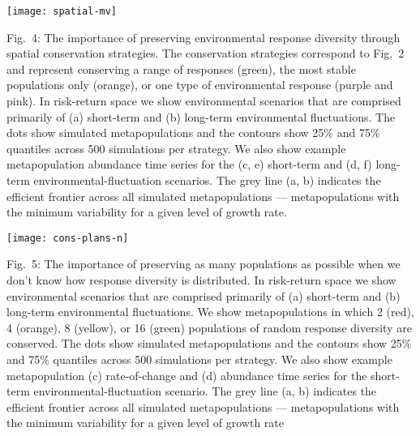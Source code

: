 \documentclass[11pt]{article}
\begin{document}
\begin{spacing}{1.4}
\clearpage

\begin{center}
\texttt{[image: spatial-mv]}
\end{center}
Fig.\ 4: The importance of preserving environmental response diversity through spatial conservation strategies. The conservation strategies correspond to Fig.\ 2 and represent conserving a range of responses (green), the most stable populations only (orange), or one type of environmental response (purple and pink). In risk-return space we show environmental scenarios that are comprised primarily of (a) short-term and (b) long-term environmental fluctuations. The dots show simulated metapopulations and the contours show 25\% and 75\% quantiles across 500 simulations per strategy. We also show example metapopulation abundance time series for the (c, e) short-term and (d, f) long-term environmental-fluctuation scenarios. The grey line (a, b) indicates the efficient frontier across all simulated metapopulations --- metapopulations with the minimum variability for a given level of growth rate.

\clearpage

\begin{center}
\texttt{[image: cons-plans-n]}
\end{center}
Fig.\ 5: The importance of preserving as many populations as possible when we don't know how response diversity is distributed. In risk-return space we show environmental scenarios that are comprised primarily of (a) short-term and (b) long-term environmental fluctuations. We show metapopulations in which 2 (red), 4 (orange), 8 (yellow), or 16 (green) populations of random response diversity are conserved. The dots show simulated metapopulations and the contours show 25\% and 75\% quantiles across 500 simulations per strategy. We also show example metapopulation (c) rate-of-change and (d) abundance time series for the short-term environmental-fluctuation scenario. The grey line (a, b) indicates the efficient frontier across all simulated metapopulations --- metapopulations with the minimum variability for a given level of growth rate

\end{spacing}

\setlength{\parskip}{8pt}
\setlength{\parindent}{0cm}

\begin{spacing}{1.2}



\end{spacing}
\end{document}
